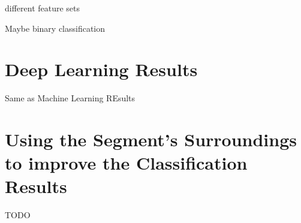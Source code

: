 \begin{table}



\caption{Resulting confusion matrix of the random forest classifier (containing 1000 trees and using entropy as criteria) applied on the parking space map filtered dataset.}
\label{table:best_clf_confusion_matrix_filtered}
\end{table}


different feature sets

Maybe binary classification


\section{Deep Learning Results}
\label{sec:deep_learning_results}

Same as Machine Learning REsults







\section{Using the Segment's Surroundings to improve the Classification Results}

TODO



